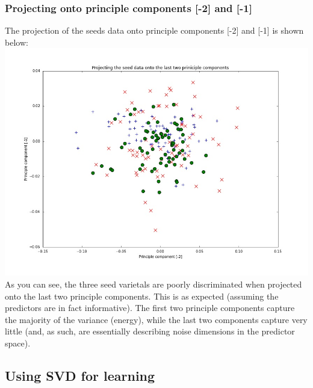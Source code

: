 \documentclass[paper=a4, fontsize=11pt]{scrartcl} %
\numberwithin{equation}{section} %
\numberwithin{figure}{section} %
\numberwithin{table}{section} %
\begin{document}
\subsubsection{Projecting onto principle components [-2] and [-1]}
The projection of the seeds data onto principle components [-2] and [-1] is shown below:
\includegraphics[scale = 0.5]{q4_aii.jpg}
As you can see, the three seed varietals are poorly discriminated when projected onto the last two principle components. This is as expected (assuming the predictors are in fact informative). The first two principle components capture the majority of the variance (energy), while the last two components capture very little (and, as such, are essentially describing noise dimensions in the predictor space). 

\subsection{Using SVD for learning}
\end{document}
